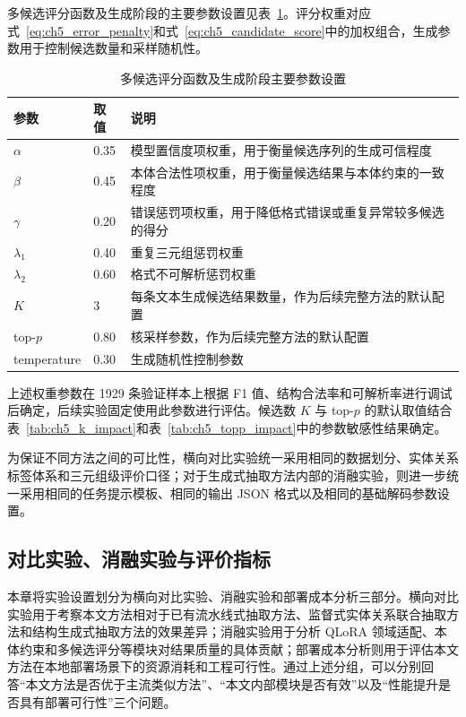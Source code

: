 \FloatBarrier

多候选评分函数及生成阶段的主要参数设置见表~\ref{tab:scoring_generation_params}。评分权重对应式~\eqref{eq:ch5_error_penalty}和式~\eqref{eq:ch5_candidate_score}中的加权组合，生成参数用于控制候选数量和采样随机性。

\begin{table}[!htbp]
  \centering
  \caption{多候选评分函数及生成阶段主要参数设置}
  \label{tab:scoring_generation_params}
  {\renewcommand{\arraystretch}{1.15}
  \small
  \setlength{\tabcolsep}{5pt}
  \begin{tabularx}{0.96\textwidth}{@{}llX@{}}
    \toprule
    参数 & 取值 & 说明 \\
    \midrule
    $\alpha$ & 0.35 & 模型置信度项权重，用于衡量候选序列的生成可信程度 \\
    $\beta$ & 0.45 & 本体合法性项权重，用于衡量候选结果与本体约束的一致程度 \\
    $\gamma$ & 0.20 & 错误惩罚项权重，用于降低格式错误或重复异常较多候选的得分 \\
    $\lambda_1$ & 0.40 & 重复三元组惩罚权重 \\
    $\lambda_2$ & 0.60 & 格式不可解析惩罚权重 \\
    $K$ & 3 & 每条文本生成候选结果数量，作为后续完整方法的默认配置 \\
    top-$p$ & 0.80 & 核采样参数，作为后续完整方法的默认配置 \\
    temperature & 0.30 & 生成随机性控制参数 \\
    \bottomrule
  \end{tabularx}}
\end{table}

上述权重参数在 1929 条验证样本上根据 F1 值、结构合法率和可解析率进行调试后确定，后续实验固定使用此参数进行评估。候选数 $K$ 与 top-$p$ 的默认取值结合表~\ref{tab:ch5_k_impact}和表~\ref{tab:ch5_topp_impact}中的参数敏感性结果确定。

\FloatBarrier

为保证不同方法之间的可比性，横向对比实验统一采用相同的数据划分、实体关系标签体系和三元组级评价口径；对于生成式抽取方法内部的消融实验，则进一步统一采用相同的任务提示模板、相同的输出 JSON 格式以及相同的基础解码参数设置。

\subsection{对比实验、消融实验与评价指标}

本章将实验设置划分为横向对比实验、消融实验和部署成本分析三部分。横向对比实验用于考察本文方法相对于已有流水线式抽取方法、监督式实体关系联合抽取方法和结构生成式抽取方法的效果差异；消融实验用于分析 QLoRA 领域适配、本体约束和多候选评分等模块对结果质量的具体贡献；部署成本分析则用于评估本文方法在本地部署场景下的资源消耗和工程可行性。通过上述分组，可以分别回答“本文方法是否优于主流类似方法”、“本文内部模块是否有效”以及“性能提升是否具有部署可行性”三个问题。


